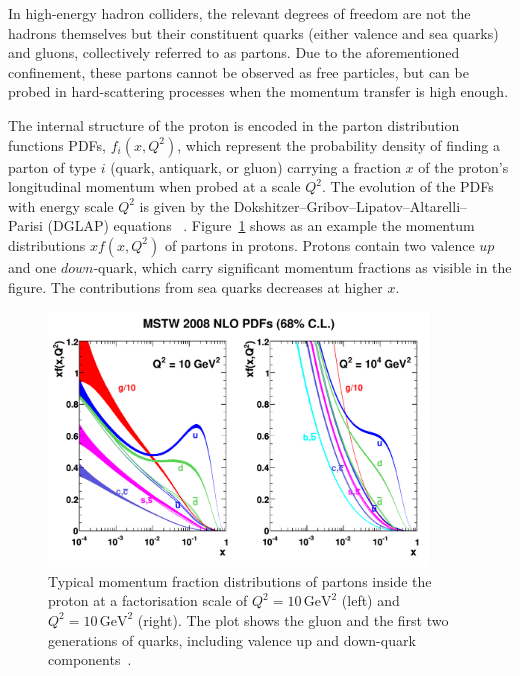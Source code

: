In high-energy hadron colliders, the relevant degrees of freedom are not the hadrons themselves but their constituent quarks (either valence and sea quarks) and gluons, collectively referred to as partons. Due to the aforementioned confinement, these partons cannot be observed as free particles, but can be probed in hard-scattering processes when the momentum transfer is high enough.

The internal structure of the proton is encoded in the parton distribution functions PDFs, \(f_i(x, Q^2)\), which represent the probability density of finding a parton of type \(i\) (quark, antiquark, or gluon) carrying a fraction \(x\) of the proton's longitudinal momentum when probed at a scale \(Q^2\). The evolution of the PDFs with energy scale $Q^2$ is given by the Dokshitzer–Gribov–Lipatov–Altarelli–\\Parisi (DGLAP) equations ~\cite{Gribov, ALTARELLI, Dokshitzer}. Figure~\ref{fig:pdfs} shows as an example the momentum distributions $xf(x,Q^2)$ of partons in protons. Protons contain two valence $up$ and one $down$-quark, which carry significant momentum fractions as visible in the figure. The contributions from sea quarks decreases at higher $x$.
\begin{figure}[htbp]
  \centering
  \includegraphics[width=0.9\textwidth]{images/pdfs.pdf}
  \caption{Typical momentum fraction distributions of partons inside the proton at a factorisation scale of \(Q^2 = 10\,\text{GeV}^2\) (left) and \(Q^2 = 10\,\text{GeV}^2\) (right). The plot shows the gluon and the first two generations of quarks, including valence up and down-quark components~\cite{Martin_2009}.}
  \label{fig:pdfs}
\end{figure}

